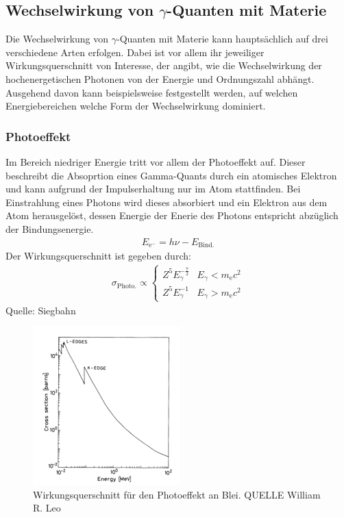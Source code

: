 \documentclass[11pt, a4paper]{article}
\numberwithin{equation}{section}
\begin{document}
\subsection{Wechselwirkung von $\gamma$-Quanten mit Materie}

Die Wechselwirkung von $\gamma$-Quanten mit Materie kann hauptsächlich auf drei verschiedene Arten erfolgen.
Dabei ist vor allem ihr jeweiliger Wirkungsquerschnitt von Interesse, der angibt, wie die Wechselwirkung der hochenergetischen Photonen von der Energie und Ordnungszahl abhängt.
Ausgehend davon kann beispielsweise festgestellt werden, auf welchen Energiebereichen welche Form der Wechselwirkung dominiert.

\subsubsection{Photoeffekt}
Im Bereich niedriger Energie tritt vor allem der Photoeffekt auf.
Dieser beschreibt die Absoprtion eines Gamma-Quants durch ein atomisches Elektron und kann aufgrund der Impulserhaltung nur im Atom stattfinden.
Bei Einstrahlung eines Photons wird dieses absorbiert und ein Elektron aus dem Atom herausgelöst, dessen Energie der Enerie des Photons entspricht abzüglich der Bindungsenergie.
\begin{align*}
E_\mathrm{e^{-}} = h \nu - E_\mathrm{Bind.}
\end{align*}
Der Wirkungsquerschnitt ist gegeben durch:
\begin{align*}
	\sigma_\mathrm{Photo.} \propto
	\begin{cases}
		Z^5 E_\gamma^{-\frac{7}{2}} & E_\gamma < m_\mathrm{e} c^2 \\
		Z^5 E_\gamma^{-1} & E_\gamma > m_\mathrm{e} c^2
	\end{cases}
\end{align*}
Quelle: Siegbahn
\begin{figure}[h]
	\centering
	\includegraphics{./figures/photoeffekt.png}
	\caption{Wirkungsquerschnitt für den Photoeffekt an Blei. QUELLE William R. Leo}
	\label{fig:photoeffekt}
\end{figure}
\end{document}
